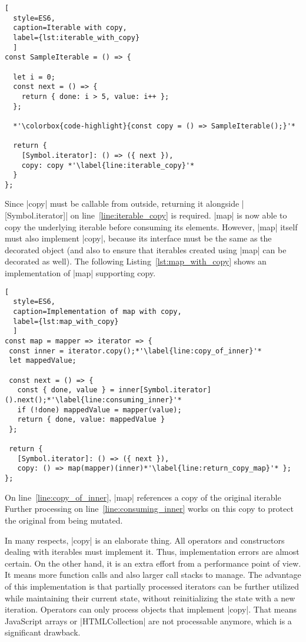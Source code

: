 \begin{lstlisting}[
  style=ES6, 
  caption=Iterable with copy,
  label={lst:iterable_with_copy}
  ]
const SampleIterable = () => {

  let i = 0;
  const next = () => {
    return { done: i > 5, value: i++ };
  };

  *'\colorbox{code-highlight}{const copy = () => SampleIterable();}'*

  return {
    [Symbol.iterator]: () => ({ next }),
    copy: copy *'\label{line:iterable_copy}'*
  }
};
\end{lstlisting}
Since |copy| must be callable from outside, returning it alongside 
|[Symbol.iterator]| on line~\ref{line:iterable_copy} is required. |map| is now
able to copy the underlying  iterable before consuming its elements.
However, |map| itself must also implement |copy|, because its interface must be
the same as the decorated object (and also to ensure that iterables created
using |map| can be decorated as well). The following Listing~\ref{lst:map_with_copy} 
shows an implementation of |map| supporting copy.

\begin{lstlisting}[
  style=ES6, 
  caption=Implementation of map with copy,
  label={lst:map_with_copy}
  ]
const map = mapper => iterator => {
 const inner = iterator.copy();*'\label{line:copy_of_inner}'*
 let mappedValue;

 const next = () => {
   const { done, value } = inner[Symbol.iterator]().next();*'\label{line:consuming_inner}'*
   if (!done) mappedValue = mapper(value);
   return { done, value: mappedValue }
 };

 return {
   [Symbol.iterator]: () => ({ next }),
   copy: () => map(mapper)(inner)*'\label{line:return_copy_map}'* };
};
\end{lstlisting}
On line~\ref{line:copy_of_inner}, |map| references a copy of the original
iterable Further processing on line~\ref{line:consuming_inner} works on this 
copy to protect the original from being mutated.

In many respects, |copy| is an elaborate thing. All operators and constructors 
dealing with iterables must implement it. Thus, implementation errors are 
almost certain. On the other hand, it is an extra effort from a performance point 
of view. It means more function calls and also larger call stacks to manage.
The advantage of this implementation is that partially processed iterators can
be further utilized while maintaining their current state, without
reinitializing the state with a new iteration.
Operators can only process objects that implement |copy|. That means JavaScript
arrays or |HTMLCollection| are not processable anymore, which is a
significant drawback.

